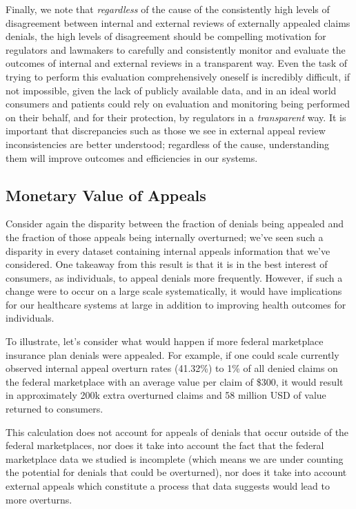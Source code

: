 \documentclass[12pt, a4paper,twoside,parskip=full]{report}
\theoremstyle{plain} %
\theoremstyle{definition} %
\theoremstyle{remark} %
\numberwithin{equation}{chapter}
\begin{document}
		Finally, we note that \emph{regardless} of the cause of the consistently high levels of disagreement between internal and external reviews of externally appealed claims denials, the high levels of disagreement should be compelling motivation for regulators and lawmakers to carefully and consistently monitor and evaluate the outcomes of internal and external reviews in a transparent way. Even the task of trying to perform this evaluation comprehensively oneself is incredibly difficult, if not impossible, given the lack of publicly available data, and in an ideal world consumers and patients could rely on evaluation and monitoring being performed on their behalf, and for their protection, by regulators in a \emph{transparent} way. It is important that discrepancies such as those we see in external appeal review inconsistencies are better understood; regardless of the cause, understanding them will improve outcomes and efficiencies in our systems. 
		
		\subsection{Monetary Value of Appeals}
		
		Consider again the disparity between the fraction of denials being appealed and the fraction of those appeals being internally overturned; we've seen such a disparity in every dataset containing internal appeals information that we've considered. One takeaway from this result is that it is in the best interest of consumers, as individuals, to appeal denials more frequently. However, if such a change were to occur on a large scale systematically, it would have implications for our healthcare systems at large in addition to improving health outcomes for individuals.
		
		To illustrate, let's consider what would happen if more federal marketplace insurance plan denials were appealed. For example, if one could scale currently observed internal appeal overturn rates (41.32\%) to 1\% of all denied claims on the federal marketplace with an average value per claim of \$300, it would result in approximately 200k extra overturned claims and 58 million USD of value returned to consumers.
		
		This calculation does not account for appeals of denials that occur outside of the federal marketplaces, nor does it take into account the fact that the federal marketplace data we studied is incomplete (which means we are under counting the potential for denials that could be overturned), nor does it take into account external appeals which constitute a process that data suggests would lead to more overturns.
		
\end{document}
